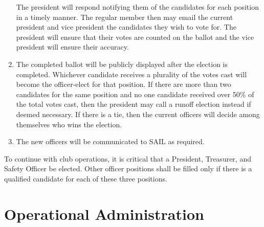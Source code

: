 \documentclass[12pt]{article}
\begin{document}
\begin{enumerate}[label=(\roman*)]
    The president will respond notifying them of the candidates for each position in a timely manner. 
    The regular member then may email the current president and vice president the candidates they wish to vote for. 
    The president will ensure that their votes are counted on the ballot and the vice president will ensure their accuracy.
    \item The completed ballot will be publicly displayed after the election is completed. 
    Whichever candidate receives a plurality of the votes cast will become the officer-elect for that position. 
    If there are more than two candidates for the same position and no one candidate received over 50\% of the total votes cast, 
    then the president may call a runoff election instead if deemed necessary. 
    If there is a tie, then the current officers will decide among themselves who wins the election.
    \item The new officers will be communicated to SAIL as required.
\end{enumerate}
To continue with club operations, it is critical that a President, Treasurer, and Safety Officer be elected. 
Other officer positions shall be filled only if there is a qualified candidate for each of these three positions.

\section{Operational Administration}
\end{document}
